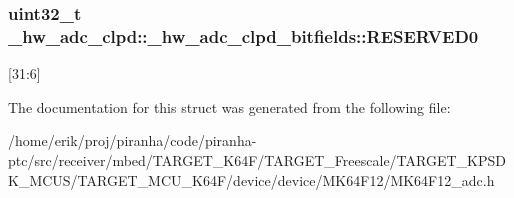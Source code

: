 \subsubsection[{\texorpdfstring{R\+E\+S\+E\+R\+V\+E\+D0}{RESERVED0}}]{\setlength{\rightskip}{0pt plus 5cm}uint32\+\_\+t \+\_\+hw\+\_\+adc\+\_\+clpd\+::\+\_\+hw\+\_\+adc\+\_\+clpd\+\_\+bitfields\+::\+R\+E\+S\+E\+R\+V\+E\+D0}\hypertarget{struct__hw__adc__clpd_1_1__hw__adc__clpd__bitfields_a50e1995dc6ab50753974368940a3b584}{}\label{struct__hw__adc__clpd_1_1__hw__adc__clpd__bitfields_a50e1995dc6ab50753974368940a3b584}
\mbox{[}31\+:6\mbox{]} 

The documentation for this struct was generated from the following file\+:\begin{DoxyCompactItemize}
\item 
/home/erik/proj/piranha/code/piranha-\/ptc/src/receiver/mbed/\+T\+A\+R\+G\+E\+T\+\_\+\+K64\+F/\+T\+A\+R\+G\+E\+T\+\_\+\+Freescale/\+T\+A\+R\+G\+E\+T\+\_\+\+K\+P\+S\+D\+K\+\_\+\+M\+C\+U\+S/\+T\+A\+R\+G\+E\+T\+\_\+\+M\+C\+U\+\_\+\+K64\+F/device/device/\+M\+K64\+F12/M\+K64\+F12\+\_\+adc.\+h\end{DoxyCompactItemize}
